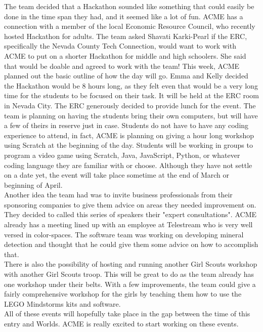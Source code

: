 \documentclass{article}
\begin{document}
The team decided that a Hackathon sounded like something that could easily be done in the time span they had, and it seemed like a lot of fun. ACME has a connection with a member of the local Economic Resource Council, who recently hosted Hackathon for adults. The team asked Shavati Karki-Pearl if the ERC, specifically the Nevada County Tech Connection, would want to work with ACME to put on a shorter Hackathon for middle and high schoolers. She said that would be doable and agreed to work with the team! This week, ACME planned out the basic outline of how the day will go. Emma and Kelly decided the Hackathon would be 8 hours long, as they felt even that would be a very long time for the students to be focused on their task. It will be held at the ERC room in Nevada City. The ERC generously decided to provide lunch for the event. The team is planning on having the students bring their own computers, but will have a few of theirs in reserve just in case. Students do not have to have any coding experience to attend, in fact, ACME is planning on giving a hour long workshop using Scratch at the beginning of the day. Students will be working in groups to program a video game using Scratch, Java, JavaScript, Python, or whatever coding language they are familiar with or choose. Although they have not settle on a date yet, the event will take place sometime at the end of March or beginning of April. \\

Another idea the team had was to invite business professionals from their sponsoring companies to give them advice on areas they needed improvement on. They decided to called this series of speakers their "expert consultations". ACME already has a meeting lined up with an employee at Telestream who is very well versed in color-spaces. The software team was working on developing mineral detection and thought that he could give them some advice on how to accomplish that. \\

There is also the possibility of hosting and running another Girl Scouts workshop with another Girl Scouts troop. This will be great to do as the team already has one workshop under their belts. With a few improvements, the team could give a fairly comprehensive workshop for the girls by teaching them how to use the LEGO Mindstorms kits and software. \\

All of these events will hopefully take place in the gap between the time of this entry and Worlds. ACME is really excited to start working on these events. \\
\end{document}
